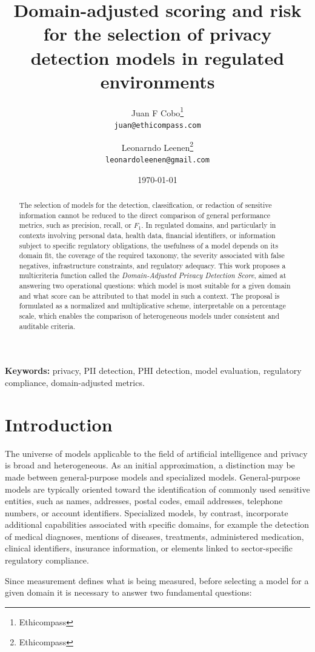 \documentclass[11pt,a4paper]{article}
\title{\textbf{Domain-adjusted scoring and risk for the selection of privacy detection models in regulated environments}}
\author{
  Juan F Cobo\thanks{Ethicompass} \\
  \texttt{juan@ethicompass.com}
  \and
  Leonarndo Leenen\thanks{Ethicompass} \\
  \texttt{leonardoleenen@gmail.com}
}
\date{\today}
\begin{document}
\maketitle

\begin{abstract}
The selection of models for the detection, classification, or redaction of sensitive information cannot be reduced to the direct comparison of general performance metrics, such as precision, recall, or $F_1$. In regulated domains, and particularly in contexts involving personal data, health data, financial identifiers, or information subject to specific regulatory obligations, the usefulness of a model depends on its domain fit, the coverage of the required taxonomy, the severity associated with false negatives, infrastructure constraints, and regulatory adequacy. This work proposes a multicriteria function called the \textit{Domain-Adjusted Privacy Detection Score}, aimed at answering two operational questions: which model is most suitable for a given domain and what score can be attributed to that model in such a context. The proposal is formulated as a normalized and multiplicative scheme, interpretable on a percentage scale, which enables the comparison of heterogeneous models under consistent and auditable criteria.
\end{abstract}

\noindent\textbf{Keywords:} privacy, PII detection, PHI detection, model evaluation, regulatory compliance, domain-adjusted metrics.

\section{Introduction}

The universe of models applicable to the field of artificial intelligence and privacy is broad and heterogeneous. As an initial approximation, a distinction may be made between general-purpose models and specialized models. General-purpose models are typically oriented toward the identification of commonly used sensitive entities, such as names, addresses, postal codes, email addresses, telephone numbers, or account identifiers. Specialized models, by contrast, incorporate additional capabilities associated with specific domains, for example the detection of medical diagnoses, mentions of diseases, treatments, administered medication, clinical identifiers, insurance information, or elements linked to sector-specific regulatory compliance.

Since measurement defines what is being measured, before selecting a model for a given domain it is necessary to answer two fundamental questions:
\end{document}
